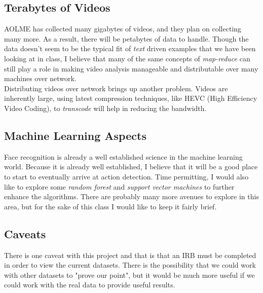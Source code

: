 \documentclass[paper=a4, fontsize=11pt]{scrartcl} %
\numberwithin{equation}{section} %
\numberwithin{figure}{section} %
\numberwithin{table}{section} %
\begin{document}
\subsection{Terabytes of Videos} 
AOLME has collected many gigabytes of videos, and they plan on collecting many more. As a result, there will be petabytes
of data to handle. Though the data doesn't seem to be the typical fit of \textit{text} driven examples that we have been
looking at in class, I believe that many of the same concepts of \textit{map-reduce} can still play a role in making video
analysis manageable and distributable over many machines over network.\\
Distributing videos over network brings up another problem. Videos are inherently large, using latest compression 
techniques, like HEVC (High Efficiency Video Coding), to \textit{transcode} will help in reducing the bandwidth.

\subsection{Machine Learning Aspects}
Face recognition is already a well established science in the machine learning world. Because it is already well established, 
I believe that it will be a good place to start to eventually arrive at action detection. Time permitting, I would also like to 
explore some \textit{random forest} and \textit{support vector machines} to further enhance the algorithms. There are
probably many more avenues to explore in this area, but for the sake of this class I would like to keep it fairly brief. 

\subsection{Caveats}
There is one caveat with this project and that is that an IRB must be completed in order to view the current datasets.  
There is the possibility that we could work with other datasets  to "prove our point", but it would be much more useful 
if we could work with the real data to provide useful results. 
\end{document}
